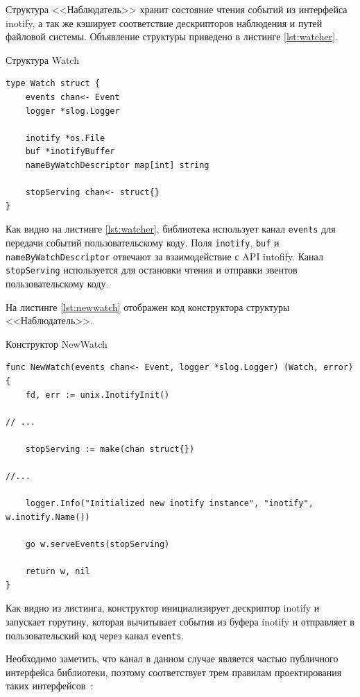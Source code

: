 \documentclass[14pt, russian]{scrartcl}
\newcommand{\code}[1]{\texttt{#1}}
\begin{document}
Структура <<Наблюдатель>> хранит состояние чтения событий из интерфейса inotify,
а так же кэширует соответствие дескрипторов наблюдения и путей файловой системы.
Объявление структуры приведено в листинге \ref{lst:watcher}.

\begin{listing}[H]
\caption{Структура Watch}
\label{lst:watcher}
\begin{verbatim}
type Watch struct {
	events chan<- Event
	logger *slog.Logger

	inotify *os.File
	buf *inotifyBuffer
	nameByWatchDescriptor map[int] string

	stopServing chan<- struct{}
}
\end{verbatim}
\end{listing}

Как видно на листинге \ref{lst:watcher}, библиотека использует канал \code{events} для передачи
событий пользовательскому коду. Поля \code{inotify}, \code{buf} и
\code{nameByWatchDescriptor} отвечают за взаимодействие с API intofify. Канал
\code{stopServing} используется для остановки чтения и отправки эвентов
пользовательскому коду.

На листинге \ref{lst:newwatch} отображен код конструктора структуры <<Наблюдатель>>.

\begin{listing}[H]
\caption{Конструктор NewWatch}
\label{lst:newwatch}
\begin{verbatim}
func NewWatch(events chan<- Event, logger *slog.Logger) (Watch, error) {
	fd, err := unix.InotifyInit()

// ...

	stopServing := make(chan struct{})

//...

	logger.Info("Initialized new inotify instance", "inotify", w.inotify.Name())

	go w.serveEvents(stopServing)

	return w, nil
}
\end{verbatim}
\end{listing}

Как видно из листинга, конструктор инициализирует дескриптор inotify и запускает
горутину, которая вычитывает события из буфера inotify и отправляет в
пользовательский код через канал \code{events}.

Необходимо заметить, что канал в данном случае является частью публичного
интерфейса библиотеки, поэтому соответствует трем правилам проектирования таких интерфейсов~\cite{goapichannels}:
\end{document}
